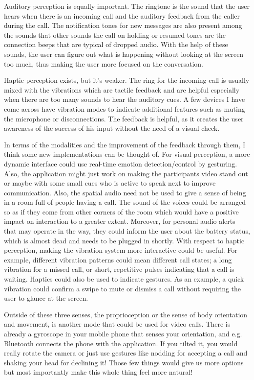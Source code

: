 \documentclass[
	letterpaper, %
]{jdf}
\begin{document}
Auditory perception is equally important. The ringtone is the sound that the user hears when there is an incoming call and the auditory feedback from the caller during the call. The notification tones for new messages are also present among the sounds that other sounds the call on holding or resumed tones are the connection beeps that are typical of dropped audio. With the help of these sounds, the user can figure out what is happening without looking at the screen too much, thus making the user more focused on the conversation.

Haptic perception exists, but it's weaker. The ring for the incoming call is usually mixed with the vibrations which are tactile feedback and are helpful especially when there are too many sounds to hear the auditory cues. A few devices I have come across have vibration modes to indicate additional features such as muting the microphone or disconnections. The feedback is helpful, as it creates the user awareness of the success of his input without the need of a visual check.

In terms of the modalities and the improvement of the feedback through them, I think some new implementations can be thought of. For visual perception, a more dynamic interface could use real-time emotion detection/control by gesturing. Also, the application might just work on making the participants video stand out or maybe with some small cues who is active to speak next to improve communication. Also, the spatial audio need not be used to give a sense of being in a room full of people having a call. The sound of the voices could be arranged so as if they come from other corners of the room which would have a positive impact on interaction to a greater extent.  Moreover, for personal audio alerts that may operate in the way, they could inform the user about the battery status, which is almost dead and needs to be plugged in shortly. With respect to haptic perception, making the vibration system more interactive could be useful. For example, different vibration patterns could mean different call states; a long vibration for a missed call, or short, repetitive pulses indicating that a call is waiting. Haptics could also be used to indicate gestures. As an example, a quick vibration could confirm a swipe to mute or dismiss a call without requiring the user to glance at the screen.

Outside of these three senses, the proprioception or the sense of body orientation and movement, is another mode that could be used for video calls. There is already a gyroscope in your mobile phone that senses your orientation, and e.g. Bluetooth connects the phone with the application. If you tilted it, you would really rotate the camera or just use gestures like nodding for accepting a call and shaking your head for declining it! Those few things would give us more options but most importantly make this whole thing feel more natural!
\end{document}
